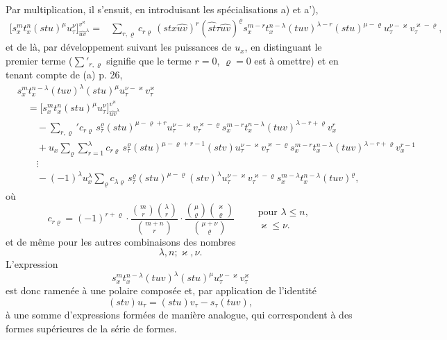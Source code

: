 \documentclass[11pt]{article}
\begin{document}
Par multiplication, il s'ensuit, en introduisant les spécialisations a) et a'),
\[
\begin{aligned}
\bigl[s_x^m t_x^n(stu)^\mu u_\tau^\nu\bigr]_{\widehat{uv}^{\lambda}}^{v^\varkappa}
={}&
\sum_{r,\varrho}c_{r\varrho}\,
(stx\widehat{uv})^r(\widehat{st}\tau\widehat{uv})^\varrho
s_x^{m-r}t_x^{n-\lambda}(tuv)^{\lambda-r}(stu)^{\mu-\varrho}
u_\tau^{\nu-\varkappa}v_\tau^{\varkappa-\varrho},
\end{aligned}
\]
et de là, par développement suivant les puissances de $u_x$, en distinguant le premier terme ($\sum'_{r,\varrho}$ signifie que le terme $r=0$, $\varrho=0$ est à omettre) et en tenant compte de (a) p. 26,
\[
\tag{II}
\begin{aligned}
&s_x^m t_x^{n-\lambda}(tuv)^\lambda(stu)^\mu u_\tau^{\nu-\varkappa}v_\tau^\varkappa\\
&\quad =
\bigl[s_x^m t_x^n(stu)^\mu u_\tau^\nu\bigr]_{\widehat{uv}^{\lambda}}^{v^\varkappa}\\
&\qquad
-\sum_{r,\varrho}' c_{r\varrho}\,s_\tau^\varrho(stu)^{\mu-\varrho+r}
u_\tau^{\nu-\varkappa}v_\tau^{\varkappa-\varrho}
s_x^{m-r}t_x^{n-\lambda}(tuv)^{\lambda-r+\varrho}v_x^r\\
&\qquad
+u_x\sum_{\varrho}\sum_{r=1}^{\lambda} c_{r\varrho}\,
s_\tau^\varrho(stu)^{\mu-\varrho+r-1}(stv)
u_\tau^{\nu-\varkappa}v_\tau^{\varkappa-\varrho}
s_x^{m-r}t_x^{n-\lambda}(tuv)^{\lambda-r+\varrho}v_x^{r-1}\\
&\qquad
\vdots\\
&\qquad
-(-1)^\lambda u_x^\lambda\sum_\varrho c_{\lambda\varrho}\,
s_\tau^\varrho(stu)^{\mu-\varrho}(stv)^\lambda
u_\tau^{\nu-\varkappa}v_\tau^{\varkappa-\varrho}
s_x^{m-\lambda}t_x^{n-\lambda}(tuv)^\varrho,
\end{aligned}
\]
où
\[
c_{r\varrho}=(-1)^{r+\varrho}\cdot
\frac{\binom{m}{r}\binom{\lambda}{r}}{\binom{m+n}{r}}\cdot
\frac{\binom{\mu}{\varrho}\binom{\varkappa}{\varrho}}{\binom{\mu+\nu}{\varrho}}
\qquad
\begin{array}{l}
\text{pour }\lambda\le n,\\
\varkappa\le\nu.
\end{array}
\]
et de même pour les autres combinaisons des nombres
\[\lambda,n;\varkappa,\nu.\]
L'expression
\[s_x^m t_x^{n-\lambda}(tuv)^\lambda(stu)^\mu u_\tau^{\nu-\varkappa}v_\tau^\varkappa\]
est donc ramenée à une polaire composée et, par application de l'identité
\[
(stv)u_\tau=(stu)v_\tau-s_\tau(tuv),
\]
à une somme d'expressions formées de manière analogue, qui correspondent à des formes supérieures de la série de formes.
\end{document}
